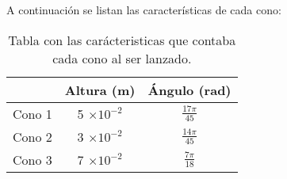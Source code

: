 A continuación se listan las características de cada cono:

\begin{table}[h]
    \centering
    \begin{tabular}{c|c|c|}
        \cline{2-3}
        \rowcolor{azulito} & Altura (m) & Ángulo (rad) \\
        \hline \multicolumn{1}{|c|}{Cono 1} & 5 $\times 10^{-2}$ & $\frac{17 \pi}{45}$ \\
        \hline \multicolumn{1}{|c|}{Cono 2} & 3 $\times 10^{-2}$ & $\frac{14 \pi}{45}$ \\
        \hline \multicolumn{1}{|c|}{Cono 3} & 7 $\times 10^{-2}$ & $\frac{7 \pi}{18}$ \\
        \hline
    \end{tabular}
    \caption{Tabla con las carácteristicas que contaba cada cono
    al ser lanzado.}
    \label{tab:ConoCar}
\end{table}
